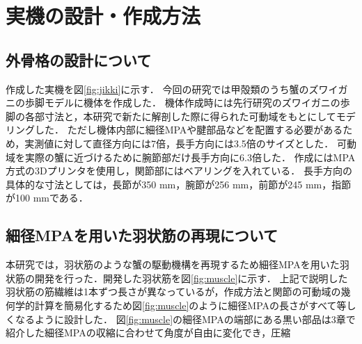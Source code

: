 \documentclass{jarticle}
\begin{document}
\vspace*{-2mm}
\section{実機の設計・作成方法}
\vspace*{-1mm}
\subsection{外骨格の設計について}

作成した実機を図\ref{fig:jikki}に示す．
今回の研究では甲殻類のうち蟹のズワイガニの歩脚モデルに機体を作成した．
機体作成時には先行研究\cite{crabrobot2}のズワイガニの歩脚の各部寸法と，本研究で新たに解剖した際に得られた可動域をもとにしてモデリングした．
ただし機体内部に細径MPAや腱部品などを配置する必要があるため，実測値に対して直径方向には7倍，長手方向には3.5倍のサイズとした．
可動域を実際の蟹に近づけるために腕節部だけ長手方向に6.3倍した．
作成にはMPA方式の3Dプリンタを使用し，関節部にはベアリングを入れている．
長手方向の具体的な寸法としては，長節が350 mm，腕節が256 mm，前節が245 mm，指節が100 mmである．
\vspace{-1mm}
\subsection{細径MPAを用いた羽状筋の再現について}

本研究では，羽状筋のような蟹の駆動機構を再現するため細径MPAを用いた羽状筋の開発を行った．開発した羽状筋を図\ref{fig:muscle}に示す．
上記で説明した羽状筋の筋繊維は1本ずつ長さが異なっているが，作成方法と関節の可動域の幾何学的計算を簡易化するため図\ref{fig:muscle}のように細径MPAの長さがすべて等しくなるように設計した．
図\ref{fig:muscle}の細径MPAの端部にある黒い部品は3章で紹介した細径MPAの収縮に合わせて角度が自由に変化でき，圧縮\\
\end{document}
